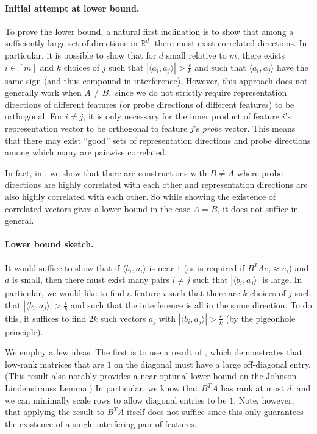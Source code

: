 \documentclass[11pt]{article}
\newcommand{\RR}{\mathbb{R}}
\begin{document}
\paragraph{Initial attempt at lower bound.}
To prove the lower bound, a natural first inclination is to show that among a sufficiently large set of directions in $\RR^d$, there must exist correlated directions. In particular, it is possible to show that for $d$ small relative to $m$, there exists $i\in [m]$ and $k$ choices of $j$ such that $|\langle a_i,a_j\rangle| > \frac{\epsilon}{k}$ and such that $\langle a_i,a_j\rangle$ have the same sign (and thus compound in interference). However, this approach does not generally work when $A\neq B,$ since we do not strictly require representation directions of different features (or probe directions of different features) to be orthogonal. For $i\neq j$, it is only necessary for the inner product of feature $i$'s representation vector to be orthogonal to feature $j$'s \textit{probe} vector. This means that there may exist ``good'' sets of representation directions and probe directions among which many are pairwise correlated.

In fact, in , we show that there are constructions with $B\neq A$ where probe directions are highly correlated with each other and representation directions are also highly correlated with each other. So while showing the existence of correlated vectors gives a lower bound in the case $A=B$, it does not suffice in general.

\paragraph{Lower bound sketch.} 
It would suffice to show that if $\langle b_i, a_i\rangle$ is near $1$ (as is required if $B^TAe_i \approx e_i$) and $d$ is small, then there must exist many pairs $i\neq j$ such that $|\langle b_i, a_j \rangle|$ is large. In particular, we would like to find a feature $i$ such that there are $k$ choices of $j$ such that $|\langle b_i, a_j \rangle| > \frac{\epsilon}{k}$ and such that the interference is all in the same direction. To do this, it suffices to find $2k$ such vectors $a_j$ with $|\langle b_i, a_j \rangle| > \frac{\epsilon}{k}$ (by the pigeonhole principle).

We employ a few ideas. The first is to use a result of \cite{alon2003problems}, which demonstrates that low-rank matrices that are $1$ on the diagonal must have a large off-diagonal entry. (This result also notably provides a near-optimal lower bound on the Johnson-Lindenstrauss Lemma.) In particular, we know that $B^TA$ has rank at most $d$, and we can minimally scale rows to allow diagonal entries to be $1$. Note, however, that applying the result to $B^TA$ itself does not suffice since this only guarantees the existence of a single interfering pair of features.
\end{document}
